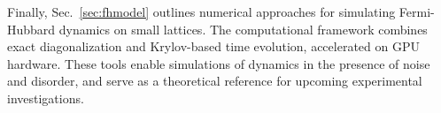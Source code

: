 Finally, Sec.~\ref{sec:fhmodel} outlines numerical approaches for simulating Fermi-Hubbard dynamics on small lattices. The computational framework combines exact diagonalization and Krylov-based time evolution, accelerated on GPU hardware. These tools enable simulations of dynamics in the presence of noise and disorder, and serve as a theoretical reference for upcoming experimental investigations.



